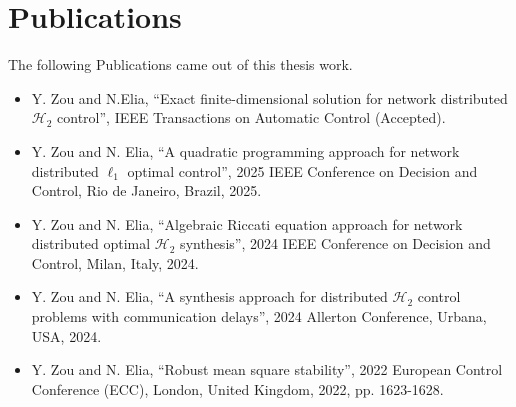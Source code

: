 \section{Publications}
The following Publications came out of this thesis work.
\begin{itemize}
    \item Y. Zou and N.Elia, ``Exact finite-dimensional solution for network distributed \(\mathcal{H}_2\) control'', IEEE Transactions on Automatic Control (Accepted).
    \item Y. Zou and N. Elia, ``A quadratic programming approach for network distributed \(\ell_1\) optimal control'', 2025 IEEE Conference on Decision and Control, Rio de Janeiro, Brazil, 2025. 
    \item Y. Zou and N. Elia, ``Algebraic Riccati equation approach for network distributed optimal \(\mathcal{H}_2\) synthesis'', 2024 IEEE Conference on Decision and Control, Milan, Italy, 2024.
    \item Y. Zou and N. Elia, ``A synthesis approach for distributed \(\mathcal{H}_2\) control problems with communication delays'', 2024 Allerton Conference, Urbana, USA, 2024.
    \item Y. Zou and N. Elia, ``Robust mean square stability'', 2022 European Control Conference (ECC), London, United Kingdom, 2022, pp. 1623-1628.
\end{itemize}